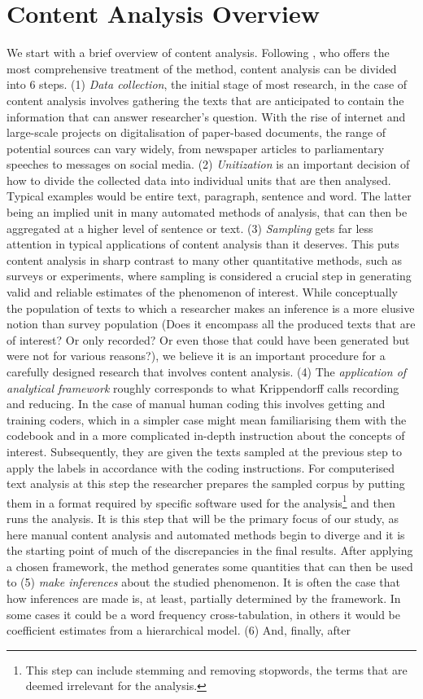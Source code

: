 \documentclass[a4paper, 12pt]{article}
\begin{document}
\section{Content Analysis Overview}
We start with a brief overview of content analysis. Following \citet{Krippendorff2004}, who offers the most comprehensive treatment of the method, content analysis can be divided into 6 steps. (1) \textit{Data collection}, the initial stage of most research, in the case of content analysis involves gathering the texts that are anticipated to contain the information that can answer researcher's question. With the rise of internet and large-scale projects on digitalisation of paper-based documents, the range of potential sources can vary widely, from newspaper articles to parliamentary speeches to messages on social media. (2) \textit{Unitization} is an important decision of how to divide the collected data into individual units that are then analysed. Typical examples would be entire text, paragraph, sentence and word. The latter being an implied unit in many automated methods of analysis, that can then be aggregated at a higher level of sentence or text. (3) \textit{Sampling} gets far less attention in typical applications of content analysis than it deserves. This puts content analysis in sharp contrast to many other quantitative methods, such as surveys or experiments, where sampling is considered a crucial step in generating valid and reliable estimates of the phenomenon of interest. While conceptually the population of texts to which a researcher makes an inference is a more elusive notion than survey population (Does it encompass all the produced texts that are of interest? Or only recorded? Or even those that could have been generated but were not for various reasons?), we believe it is an important procedure for a carefully designed research that involves content analysis. (4) The \textit{application of analytical framework} roughly corresponds to what Krippendorff calls recording and reducing. In the case of manual human coding this involves getting and training coders, which in a simpler case might mean familiarising them with the codebook and in a more complicated in-depth instruction about the concepts of interest. Subsequently, they are given the texts sampled at the previous step to apply the labels in accordance with the coding instructions. For computerised text analysis at this step the researcher prepares the sampled corpus by putting them in a format required by specific software used for the analysis\footnote{This step can include stemming and removing stopwords, the terms that are deemed irrelevant for the analysis.} and then runs the analysis. It is this step that will be the primary focus of our study, as here manual content analysis and automated methods begin to diverge and it is the starting point of much of the discrepancies in the final results. After applying a chosen framework, the method generates some quantities that can then be used to (5) \textit{make inferences} about the studied phenomenon. It is often the case that how inferences are made is, at least, partially determined by the framework. In some cases it could be a word frequency cross-tabulation, in others it would be coefficient estimates from a hierarchical model. (6) And, finally, after 
\end{document}
